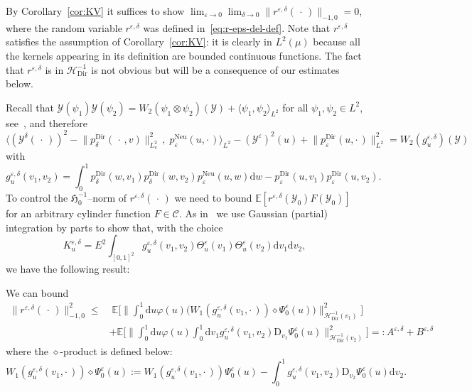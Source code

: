 \documentclass[AHL,Unicode,longabstracts]{cedram}
\DeclareMathOperator{\Dir}{Dir}
\DeclareMathOperator{\Neu}{Neu}
\newcommand{\mc}[1]{{\mathcal #1}}
\renewcommand{\mc}[1]{{\mathcal #1}}
\newcommand{\mrD}{\mathrm{D}}
\renewcommand{\le}{\leqslant}
\newcommand*{\dd}{\mathrm{d}}
\newcommand*{\du}{\dd u}
\newcommand*{\dv}{\dd v}
\newcommand*{\dw}{\dd w}
\begin{document}
By Corollary~\ref{cor:KV} it suffices to show $\lim_{\varepsilon \rightarrow 0} \lim_{\delta \rightarrow 0} \| r^{\varepsilon, \delta} ({\,\cdot\,})\|_{- 1,0} = 0$, where the random variable $r^{\varepsilon, \delta}$ was defined in~\eqref{eq:r-eps-del-def}. Note that $r^{\varepsilon,\delta}$ satisfies the assumption of Corollary~\ref{cor:KV}: it is clearly in $L^2(\mu)$ because all the kernels appearing in its definition are bounded continuous functions. The fact that $r^{\varepsilon,\delta}$ is in $\mc H_{\Dir}^{- 1}$ is not obvious but will be a consequence of our estimates below.

Recall that $\mc Y(\psi_1) \mc Y(\psi_2) = W_2(\psi_1 \otimes \psi_2)(\mc Y) + \langle \psi_1, \psi_2\rangle_{L^2}$ for all $\psi_1, \psi_2 \in L^2$, see~\cite[Proposition~1.1.2]{Nualart2006}, and therefore
\[
\Big\langle (\mc Y^{\delta}({\,\cdot\,}))^2 -\big\|p^{\Dir}_{\delta} (\,\cdot\,, v)\big\|_{L^2_v}^2 \,,\; p^{\Neu}_{\varepsilon} (u, \cdot\,)\Big\rangle_{L^2} - (\mc Y^{\varepsilon})^2 (u) +\big\|p^{\Dir}_{\varepsilon} (u, \cdot\,) \big\|_{L^2}^2 = W_2 (g^{\varepsilon,\delta}_u) (\mc Y)
\]
with
\begin{equation}\label{eq:g-eps-delta-def}
g^{\varepsilon, \delta}_u (v_1, v_2) =\int_0^1 p^{\Dir}_{\delta} (w, v_1) p^{\Dir}_{\delta} (w, v_2) p^{\Neu}_{\varepsilon} (u, w) \dw - p^{\Dir}_{\varepsilon} (u, v_1) p^{\Dir}_{\varepsilon} (u, v_2).
\end{equation}
To control the $\mathfrak{H}_0^{- 1}$--norm of $r^{\varepsilon, \delta} ({\,\cdot\,})$ we need to bound $\mathbb{E} [r^{\varepsilon, \delta} (\mc Y_0) F (\mc Y_0)]$ for an arbitrary cylinder function $F \in \mathcal{C}$. As in~\cite[Lemma~4.4]{Gubinelli2015Energy} we use Gaussian (partial) integration by parts to show that, with the choice
\begin{equation}\label{eq:K-eps-delta-def}
K^{\varepsilon, \delta}_u = E^2
\int_{[0, 1]^2} g^{\varepsilon, \delta}_u (v_1, v_2) \Theta^{\varepsilon}_u (v_1) \Theta^{\varepsilon}_u (v_2) \dv_1 \dv_2,
\end{equation}
we have the following result:

\begin{lemm}\label{lem:r-eps-constants}
We can bound
\begin{align*}
\big\| r^{\varepsilon, \delta} ({\,\cdot\,}) \big\|_{- 1,0}^2 \le & \;
\mathbb{E} \bigg[\bigg\| \int_0^1 \du \varphi (u) \big(W_1 (g^{\varepsilon, \delta}_u (v_1, \cdot\,)) \diamond \Psi^{\varepsilon}_0 (u)\big) \bigg\|_{\mc H_{\Dir}^{- 1}(v_1)}^2 \bigg]\\
& + \mathbb{E} \bigg[\bigg\| \int_0^1 \du \varphi (u) \int_0^1 \dv_1 g^{\varepsilon, \delta}_u (v_1, v_2) \mathrm{D}_{v_1}
\Psi^{\varepsilon}_0 (u) \bigg\|_{\mc H_{\Dir}^{- 1}(v_2)}^2 \bigg] = : A^{\varepsilon, \delta} + B^{\varepsilon, \delta}
\end{align*}
where the $\diamond$-product is defined below:
\[
W_1 (g^{\varepsilon, \delta}_u (v_1, \cdot\,)) \diamond \Psi^{\varepsilon}_0 (u) := W_1 (g^{\varepsilon, \delta}_u (v_1,\cdot\,)) \Psi^{\varepsilon}_0 (u) - \int_0^1 g^{\varepsilon, \delta}_u (v_1, v_2) \mrD_{v_2} \Psi^{\varepsilon}_0 (u) \dv_2.
\]
\end{lemm}
\end{document}
